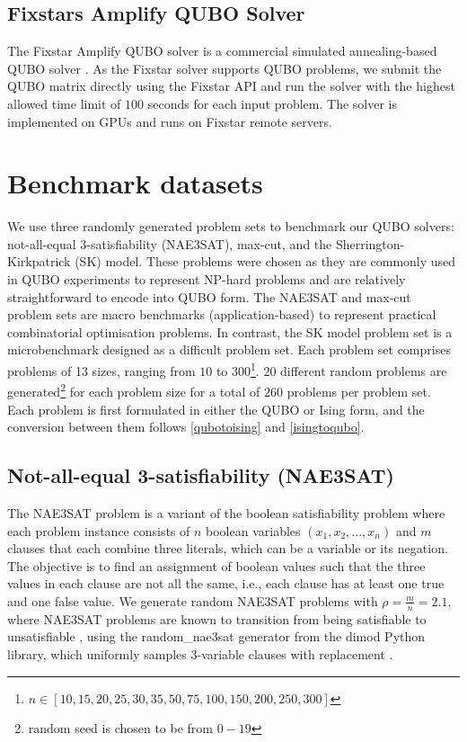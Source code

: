 
\subsection{Fixstars Amplify QUBO Solver}
The Fixstar Amplify QUBO solver is a commercial simulated annealing-based QUBO solver \cite{b12}. As the Fixstar solver supports QUBO problems, we submit the QUBO matrix directly using the Fixstar API and run the solver with the highest allowed time limit of $100$ seconds for each input problem. The solver is implemented on GPUs and runs on Fixstar remote servers.

\section{Benchmark datasets}
We use three randomly generated problem sets to benchmark our QUBO solvers: not-all-equal 3-satisfiability (NAE3SAT), max-cut, and the Sherrington-Kirkpatrick (SK) model. These problems were chosen as they are commonly used in QUBO experiments to represent NP-hard problems and are relatively straightforward to encode into QUBO form. The NAE3SAT and max-cut problem sets are macro benchmarks (application-based) to represent practical combinatorial optimisation problems. In contrast, the SK model problem set is a microbenchmark designed as a difficult problem set. Each problem set comprises problems of 13 sizes, ranging from $10$ to $300$\footnote{$n \in [10,15,20,25,30,35,50,75,100,150,200,250,300]$}. $20$ different random problems are generated\footnote{random seed is chosen to be from $0-19$} for each problem size for a total of $260$ problems per problem set. Each problem is first formulated in either the QUBO or Ising form, and the conversion between them follows \autoref{qubotoising} and \autoref{isingtoqubo}.

\subsection*{Not-all-equal 3-satisfiability (NAE3SAT)}
The NAE3SAT problem is a variant of the boolean satisfiability problem where each problem instance consists of $n$ boolean variables $(x_1, x_2, ..., x_n)$ and $m$ clauses that each combine three literals, which can be a variable or its negation. The objective is to find an assignment of boolean values such that the three values in each clause are not all the same, i.e., each clause has at least one true and one false value. We generate random NAE3SAT problems with $\rho = \frac{m}{n} = 2.1$, where NAE3SAT problems are known to transition from being satisfiable to unsatisfiable \cite{nae3sattransition}, using the random\_nae3sat generator from the dimod Python library, which uniformly samples 3-variable clauses with replacement \cite{dimodrandomnae3sat}. 

